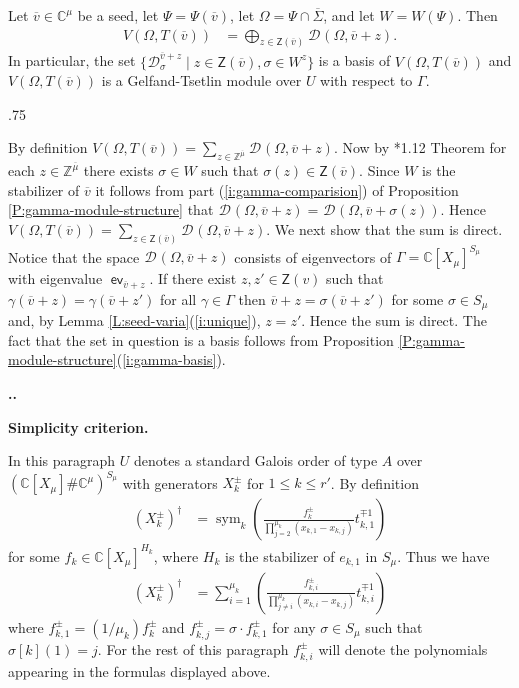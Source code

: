 \documentclass[11pt,fleqn]{amsart}
\makeatletter
\renewcommand\thesection{\arabic{section}}
\renewcommand\proofname{Proof}
\renewenvironment{proof}[1][\textit{\proofname}]{\par
 \pushQED{\qed}%
 \normalfont \topsep.75\paraskip\relax
 \trivlist
 \item[\hskip\labelsep
 \itshape
 #1\@addpunct{.}]\ignorespaces
}{%
 \popQED\endtrivlist\@endpefalse
}
\newcounter{para}[section]
\renewcommand\thepara{\thesection.\arabic{para}}
\def\paragraph{%
 \noindent
 \refstepcounter{para}%
 \textbf{\thepara.}\hspace{1ex}%
}
\newcommand\about[1]{%
 {\bfseries#1.}%
}
\newcommand\CC{\mathbb C}
\newcommand\ZZ{\mathbb Z}
\newcommand\DD[3]{{}^{#1} \mathcal D_{#2}^{#3}}
\newcommand\Z{\mathsf Z}
\newcommand\vv{\overline{v}}
\DeclareMathOperator\sym{sym}
\DeclareMathOperator\ev{\mathsf{ev}}
\makeatother
\begin{document}
\begin{Theorem}
\label{T:direct-sum}
Let $\vv \in \CC^\mu$ be a seed, let $\Psi = \Psi(\vv)$, let $\Omega = \Psi 
\cap \overline \Sigma$, and let $W = W(\Psi)$. Then
\begin{align*}
V(\Omega, T(\vv))
 &= \bigoplus_{z \in \Z(\vv)} \DD{}{}{}(\Omega, \vv + z).
\end{align*} 
In particular, the set $\{\DD{}{\sigma}{\vv + z} \mid z \in \Z(\vv), \sigma 
\in W^z\}$
is a basis of $V(\Omega, T(\vv))$ and $V(\Omega, T(\vv))$ is a Gelfand-Tsetlin
module over $U$ with respect to $\Gamma$.
\end{Theorem}
\begin{proof}
By definition $V(\Omega, T(\vv)) = \sum_{z \in \ZZ^{\overline \mu}} 
\DD{}{}{}(\Omega, \vv + z)$. Now by \cite{Hump-coxeter-book}*{1.12 Theorem} 
for each $z \in \ZZ^{\overline \mu}$ there exists $\sigma \in W$ such that 
$\sigma(z) \in \Z(\vv)$. Since $W$ is the stabilizer of $\vv$ it follows from 
part (\ref{i:gamma-comparision})
of Proposition \ref{P:gamma-module-structure} that $\DD{}{}{}(\Omega, \vv + 
z) = \DD{}{}{}(\Omega, \vv + \sigma(z))$. Hence $V(\Omega, T(\vv)) = 
\sum_{z \in \Z(\vv)} \DD{}{}{}(\Omega, \vv + z)$. We next show that the sum is 
direct. Notice that the space $\DD{}{}{}(\Omega, 
\vv + z)$ consists of eigenvectors of $\Gamma = \CC[X_\mu]^{S_\mu}$ with 
eigenvalue $\ev_{\vv + z}$. If there exist $z, z' \in \Z(v)$ such that 
$\gamma(\vv + z) = \gamma(\vv + z')$ for all $\gamma \in \Gamma$ then $\vv + z 
= \sigma(\vv + z')$ for some $\sigma \in S_\mu$ and, by 
Lemma \ref{L:seed-varia}(\ref{i:unique}), $z = z'$. Hence  the sum  is  
direct. The fact that the set in question is a basis follows from Proposition 
\ref{P:gamma-module-structure}(\ref{i:gamma-basis}).
\end{proof}

\paragraph
\about{Simplicity criterion}
In this paragraph $U$ denotes a standard Galois order of type $A$ over 
$(\CC[X_\mu] \# \CC^\mu)^{S_\mu}$ with generators $X^\pm_k$ for $1 \leq k 
\leq r'$. By definition
\begin{align*}
(X_{k}^\pm)^\dagger
	&=\sym_k \left(
 	\frac{f_k^\pm}{\prod_{j = 2}^{\mu_k} (x_{k,1} - x_{k,j})} t_{k,1}^{\mp 1} 
\right)
\end{align*}
for some $f_k \in \CC[X_\mu]^{H_k}$, where $H_k$ is the stabilizer of $e_{k,1}$
in $S_\mu$. Thus we have
\begin{align*}
(X_{k}^\pm)^\dagger
 &=\sum_{i=1}^{\mu_k} \left(
 \frac{f_{k,i}^\pm}{\prod_{j \neq i}^{\mu_k} (x_{k,i} - x_{k,j})} 
 t_{k,i}^{\mp 1}
\right)
\end{align*}
where $f_{k,1}^{\pm} = (1/\mu_k) f_k^\pm$ and $f_{k,j}^\pm = \sigma \cdot 
f_{k,1}^\pm$ for any $\sigma \in S_\mu$ such that $\sigma[k](1) = j$. For the 
rest of this paragraph $f_{k,i}^\pm$ will denote the polynomials appearing in 
the formulas displayed above. 
\end{document}
